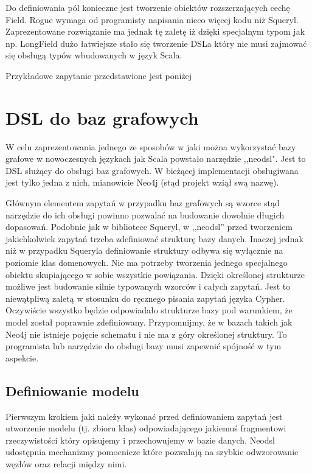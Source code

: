 \documentclass[brudnopis]{xmgr}
\begin{document}
Do definiowania pól konieczne jest tworzenie obiektów rozszerzających cechę Field. Rogue wymaga od programisty napisania nieco więcej kodu niż Squeryl. Zaprezentowane rozwiązanie ma jednak tę zaletę iż dzięki specjalnym typom jak np. LongField dużo łatwiejsze stało się tworzenie DSLa który nie musi zajmować się obsługą typów wbudowanych w język Scala.

Przykładowe zapytanie przedstawione jest poniżej



\chapter{DSL do baz grafowych}

W celu zaprezentowania jednego ze sposobów w jaki można wykorzystać bazy grafowe w nowoczesnych językach jak Scala powstało narzędzie ,,neodsl". Jest to DSL służący do obsługi baz grafowych. W bieżącej implementacji obsługiwana jest tylko jedna z nich, mianowicie Neo4j (stąd projekt wziął swą nazwę). 

Głównym elementem zapytań w przypadku baz grafowych są wzorce stąd narzędzie do ich obsługi powinno pozwalać na budowanie dowolnie długich dopasowań. Podobnie jak w bibliotece Squeryl, w ,,neodsl'' przed tworzeniem jakichkolwiek zapytań trzeba zdefiniować strukturę bazy danych. Inaczej jednak niż w przypadku Squeryla definiowanie struktury odbywa się wyłącznie na poziomie klas domenowych. Nie ma potrzeby tworzenia jednego specjalnego obiektu skupiającego w sobie wszystkie powiązania. Dzięki określonej strukturze możliwe jest budowanie silnie typowanych wzorców i całych zapytań. Jest to niewątpliwą zaletą w stosunku do ręcznego pisania zapytań języka Cypher. Oczywiście wszystko będzie odpowiadało strukturze bazy pod warunkiem, że model został poprawnie zdefiniowany. Przypomnijmy, że w bazach takich jak Neo4j nie istnieje pojęcie schematu i nie ma z góry określonej struktury. To programista lub narzędzie do obsługi bazy musi zapewnić spójność w tym aspekcie.

\section{Definiowanie modelu}

Pierwszym krokiem jaki należy wykonać przed definiowaniem zapytań jest utworzenie modelu (tj. zbioru klas) odpowiadającego jakiemuś fragmentowi rzeczywistości który opisujemy i przechowujemy w bazie danych. Neodsl udostępnia mechanizmy pomocnicze które pozwalają na szybkie odwzorowanie węzłów oraz relacji między nimi.
\end{document}
